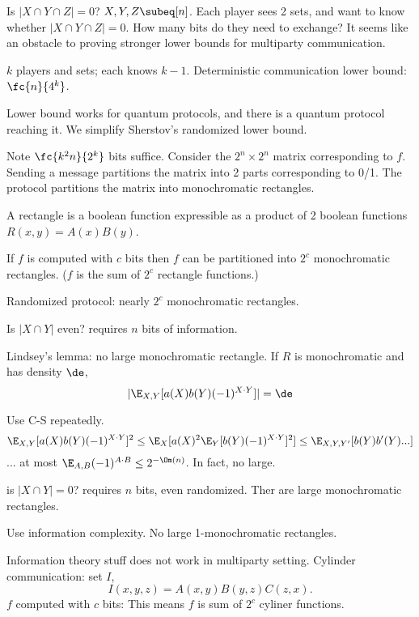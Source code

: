 

Is $|X\cap Y\cap Z|=0$? $X,Y,Z\subeq [n]$. Each player sees 2 sets, and want to know whether $|X\cap Y\cap Z|=0$. How many bits do they need to exchange? It seems like an obstacle to proving stronger lower bounds for multiparty communication. 

$k$ players and sets; each knows $k-1$. 
Deterministic communication lower bound: $\fc{n}{4^k}$. 

Lower bound works for quantum protocols, and there is a quantum protocol reaching it. We simplify Sherstov's randomized lower bound.

Note $\fc{k^2 n}{2^k}$ bits suffice.
Consider the $2^n\times 2^n$ matrix corresponding to $f$. Sending a message partitions the matrix into 2 parts corresponding to 0/1. The protocol partitions the matrix into monochromatic rectangles.

A rectangle is a boolean function expressible as a product of 2 boolean functions $R(x,y)=A(x)B(y)$.

\begin{thm}
If $f$ is computed with $c$ bits then $f$ can be partitioned into $2^c$ monochromatic rectangles. %
($f$ is the sum of $2^c$ rectangle functions.)
\end{thm}
 Randomized protocol: nearly $2^c$ monochromatic rectangles.

Is $|X\cap Y|$ even? requires $n$ bits of information.

Lindsey's lemma: no large monochromatic rectangle. If $R$ is monochromatic and has density $\de$,
\[
|\E_{X,Y}[a(X)b(Y)(-1)^{X\cdot Y}]|=\de
\]

Use C-S repeatedly.
\[
\E_{X,Y}[a(X)b(Y) (-1)^{X\cdot Y}]^2 \le \E_X [a(X)^2 \E_Y [b(Y)(-1)^{X\cdot Y}]^2]\le \E_{X,Y,Y'}[b(Y)b'(Y)...]
\]
... at most $\E_{A,B} (-1)^{A\cdot B}\le 2^{-\Om(n)}$. In fact, no large. 

is $|X\cap Y|=0$? requires $n$ bits, even randomized. Ther are large monochromatic rectangles.

Use information complexity. No large 1-monochromatic rectangles.

Information theory stuff does not work in multiparty setting.
Cylinder communication: set $I$,
\[
I(x,y,z)=A(x,y)B(y,z)C(z,x).
\]
$f$ computed with $c$ bits: This means $f$ is sum of $2^c$ cyliner functions.

